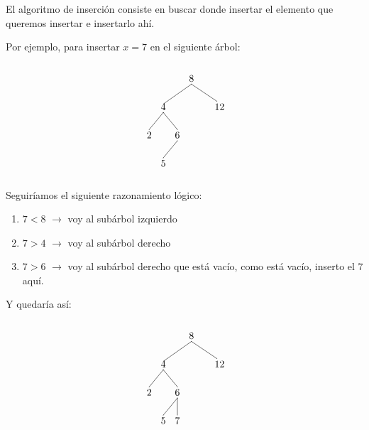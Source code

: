 \documentclass[10pt,a4paper,spanish]{report}
\begin{document}
\noindent
El algoritmo de inserción consiste en buscar donde insertar el elemento que queremos insertar e insertarlo ahí.

\noindent
Por ejemplo, para insertar $x = 7$ en el siguiente árbol:

\[\begin{xy}
,(0,0)*+=<10mm>[]\txt<2cm>{8}
,(-10,-10)*+=<10mm>[]\txt<2cm>{4}
,(10,-10)*+=<10mm>[]\txt<2cm>{12}
,(-15,-20)*+=<10mm>[]\txt<2cm>{2}
,(-5,-20)*+=<10mm>[]\txt<2cm>{6}
,(-10,-30)*+=<10mm>[]\txt<2cm>{5}

\ar@{-} (0,-2);(-10,-9) %
\ar@{-} (0,-2);(9,-8) %
\ar@{-} (-10,-12);(-15,-18) %
\ar@{-} (-10,-12);(-5,-18) %
\ar@{-} (-5,-22);(-10,-28) %
\end{xy}\]

\noindent
Seguiríamos el siguiente razonamiento lógico:

\begin{enumerate}[$\bigstar$]
      \item $7 < 8$ $\longrightarrow$ voy al subárbol izquierdo
      \item $7 > 4$ $\longrightarrow$ voy al subárbol derecho
      \item $7 > 6$ $\longrightarrow$ voy al subárbol derecho que está vacío, como está vacío, inserto el $7$ aquí.
\end{enumerate}

\noindent
Y quedaría así:

\[\begin{xy}
,(0,0)*+=<10mm>[]\txt<2cm>{8}
,(-10,-10)*+=<10mm>[]\txt<2cm>{4}
,(10,-10)*+=<10mm>[]\txt<2cm>{12}
,(-15,-20)*+=<10mm>[]\txt<2cm>{2}
,(-5,-20)*+=<10mm>[]\txt<2cm>{6}
,(-10,-30)*+=<10mm>[]\txt<2cm>{5}
,(-5,-30)*+=<10mm>[]\txt<2cm>{7}

\ar@{-} (0,-2);(-10,-9) %
\ar@{-} (0,-2);(9,-8) %
\ar@{-} (-10,-12);(-15,-18) %
\ar@{-} (-10,-12);(-5,-18) %
\ar@{-} (-5,-22);(-10,-28) %
\ar@{-} (-5,-22);(-5,-28) %
\end{xy}\]
\end{document}
